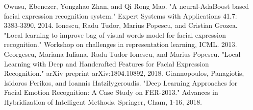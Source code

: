 \documentclass[conference]{IEEEtran}
\begin{document}
\begin{thebibliography}{1}
Owusu, Ebenezer, Yongzhao Zhan, and Qi Rong Mao. "A neural-AdaBoost based facial expression recognition system." Expert Systems with Applications 41.7: 3383-3390, 2014.
Ionescu, Radu Tudor, Marius Popescu, and Cristian Grozea. "Local learning to improve bag of visual words model for facial expression recognition." Workshop on challenges in representation learning, ICML. 2013.
Georgescu, Mariana-Iuliana, Radu Tudor Ionescu, and Marius Popescu. "Local Learning with Deep and Handcrafted Features for Facial Expression Recognition." arXiv preprint arXiv:1804.10892, 2018.
Giannopoulos, Panagiotis, Isidoros Perikos, and Ioannis Hatzilygeroudis. "Deep Learning Approaches for Facial Emotion Recognition: A Case Study on FER-2013." Advances in Hybridization of Intelligent Methods. Springer, Cham,  1-16, 2018.

\end{thebibliography}
\end{document}
